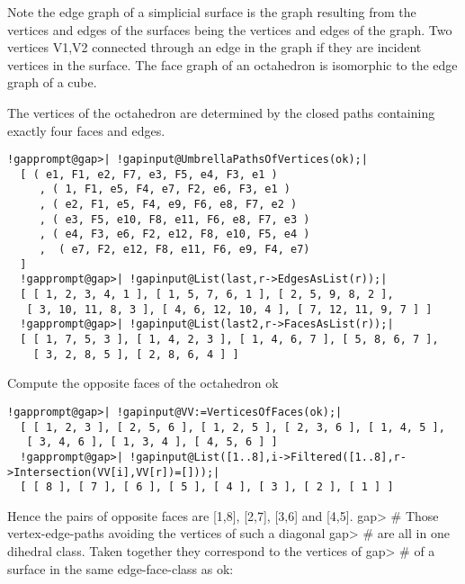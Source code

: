\documentclass[a4paper,11pt]{report}
\begin{document}
{{{ 
\begin{center}

\end{center}
 

 Note the edge graph of a simplicial surface is the graph resulting from the
vertices and edges of the surfaces being the vertices and edges of the graph.
Two vertices V1,V2 connected through an edge in the graph if they are incident
vertices in the surface. The face graph of an octahedron is isomorphic to the
edge graph of a cube. 

 
\begin{center}

\end{center}
 

 The vertices of the octahedron are determined by the closed paths containing
exactly four faces and edges. 

 
\begin{Verbatim}[commandchars=!@|,fontsize=\small,frame=single,label=Example]
  !gapprompt@gap>| !gapinput@UmbrellaPathsOfVertices(ok);|
  [ ( e1, F1, e2, F7, e3, F5, e4, F3, e1 )
     , ( 1, F1, e5, F4, e7, F2, e6, F3, e1 )
     , ( e2, F1, e5, F4, e9, F6, e8, F7, e2 )
     , ( e3, F5, e10, F8, e11, F6, e8, F7, e3 )
     , ( e4, F3, e6, F2, e12, F8, e10, F5, e4 )
     ,  ( e7, F2, e12, F8, e11, F6, e9, F4, e7) 
  ]
  !gapprompt@gap>| !gapinput@List(last,r->EdgesAsList(r));|
  [ [ 1, 2, 3, 4, 1 ], [ 1, 5, 7, 6, 1 ], [ 2, 5, 9, 8, 2 ], 
   [ 3, 10, 11, 8, 3 ], [ 4, 6, 12, 10, 4 ], [ 7, 12, 11, 9, 7 ] ]
  !gapprompt@gap>| !gapinput@List(last2,r->FacesAsList(r));|
  [ [ 1, 7, 5, 3 ], [ 1, 4, 2, 3 ], [ 1, 4, 6, 7 ], [ 5, 8, 6, 7 ], 
    [ 3, 2, 8, 5 ], [ 2, 8, 6, 4 ] ]
\end{Verbatim}
 

 Compute the opposite faces of the octahedron ok 

 
\begin{Verbatim}[commandchars=!@|,fontsize=\small,frame=single,label=Example]
  !gapprompt@gap>| !gapinput@VV:=VerticesOfFaces(ok);|
  [ [ 1, 2, 3 ], [ 2, 5, 6 ], [ 1, 2, 5 ], [ 2, 3, 6 ], [ 1, 4, 5 ], 
   [ 3, 4, 6 ], [ 1, 3, 4 ], [ 4, 5, 6 ] ]
  !gapprompt@gap>| !gapinput@List([1..8],i->Filtered([1..8],r->Intersection(VV[i],VV[r])=[]));|
  [ [ 8 ], [ 7 ], [ 6 ], [ 5 ], [ 4 ], [ 3 ], [ 2 ], [ 1 ] ]
\end{Verbatim}
 

 Hence the pairs of opposite faces are [1,8], [2,7], [3,6] and [4,5].
gap{\textgreater} \# Those vertex-edge-paths avoiding the vertices of such a
diagonal gap{\textgreater} \# are all in one dihedral class. Taken together
they correspond to the vertices of gap{\textgreater} \# of a surface in the
same edge-face-class as ok: 

}}}
\end{document}
